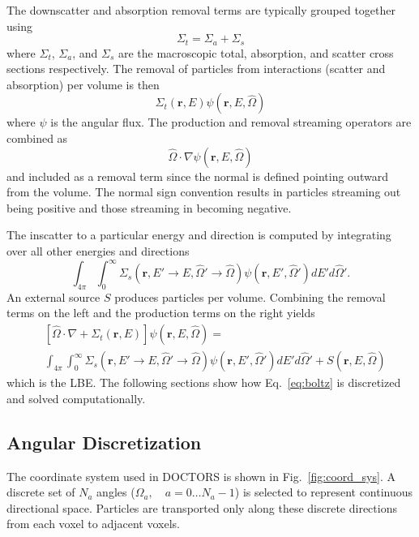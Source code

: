 The downscatter and absorption removal terms are typically grouped together using
\begin{equation}
\Sigma_t = \Sigma_a + \Sigma_s
\end{equation}
where $\Sigma_t$, $\Sigma_a$, and $\Sigma_s$ are the macroscopic total, absorption, and scatter cross sections respectively. The removal of particles from interactions (scatter and absorption) per volume is then
\begin{equation}
\Sigma_t(\boldsymbol{r}, E) \psi(\boldsymbol{r}, E, \hat{\Omega})
\end{equation}
where $\psi$ is the angular flux. The production and removal streaming operators are combined as 
\begin{equation}
\hat{\Omega} \cdot \nabla \psi(\boldsymbol{r}, E, \hat{\Omega})
\end{equation}
and included as a removal term since the normal is defined pointing outward from the volume. The normal sign convention results in particles streaming out being positive and those streaming in becoming negative. 

The inscatter to a particular energy and direction is computed by integrating over all other energies and directions
\begin{equation}
\int_{4\pi}^{} \int_{0}^{\infty} \Sigma_s(\boldsymbol{r}, E' \rightarrow E, \hat{\Omega}' \rightarrow \hat{\Omega}) \psi(\boldsymbol{r}, E', \hat{\Omega}') dE' d\hat{\Omega}'.
\end{equation}
An external source $S$ produces particles per volume. Combining the removal terms on the left and the production terms on the right yields
\begin{equation} \label{eq:boltz}
\begin{split}
	&\left[ \hat{\Omega} \cdot \nabla + \Sigma_t(\boldsymbol{r}, E) \right]
	\psi(\boldsymbol{r}, E, \hat{\Omega}) = \\
	&\int_{4 \pi} \int_0^\infty \Sigma_s(\boldsymbol{r}, E' \rightarrow E, \hat{\Omega}' \rightarrow \hat{\Omega}) \psi(\boldsymbol{r}, E', \hat{\Omega}') dE' d\hat{\Omega}' + S(\boldsymbol{r}, E, \hat{\Omega})
\end{split}
\end{equation}
which is the LBE. The following sections show how Eq.~\ref{eq:boltz} is discretized and solved computationally.

\subsection{Angular Discretization}
The coordinate system used in DOCTORS is shown in Fig.~\ref{fig:coord_sys}. A discrete set of $N_a$ angles ($\Omega_{a}, \quad a = 0 \ldots N_a-1$) is selected to represent continuous directional space. Particles are transported only along these discrete directions from each voxel to adjacent voxels.

